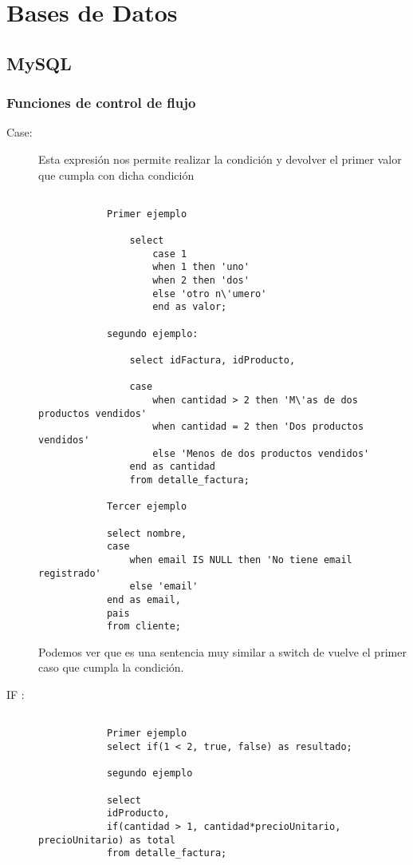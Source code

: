 \part{Bases de Datos}

\chapter{MySQL}

\section{Funciones de control de flujo}
\begin{description}
	\item[Case: ] Esta expresi\'on nos permite realizar la condici\'on y devolver el primer valor que cumpla con dicha condici\'on
		\begin{ejemplo}
			\begin{verbatim}
				
			Primer ejemplo
			
				select 
					case 1
					when 1 then 'uno'
					when 2 then 'dos'
					else 'otro n\'umero'
					end as valor;
					
			segundo ejemplo:
			
				select idFactura, idProducto,
				
				case 
					when cantidad > 2 then 'M\'as de dos productos vendidos'
					when cantidad = 2 then 'Dos productos vendidos'
					else 'Menos de dos productos vendidos'
				end as cantidad
				from detalle_factura;

			Tercer ejemplo
			
			select nombre,
			case
				when email IS NULL then 'No tiene email registrado'
				else 'email'
			end as email,
			pais
			from cliente;
			\end{verbatim}
		Podemos ver que es una sentencia muy similar a switch de vuelve el primer caso que cumpla la condici\'on. 
		\end{ejemplo}
	\item[IF :] 
	\begin{ejemplo}
		\begin{verbatim}

			Primer ejemplo
			select if(1 < 2, true, false) as resultado;
			
			segundo ejemplo
			
			select 
			idProducto,
			if(cantidad > 1, cantidad*precioUnitario, precioUnitario) as total
			from detalle_factura;
			

\end{verbatim}
\end{ejemplo}
\end{description}
